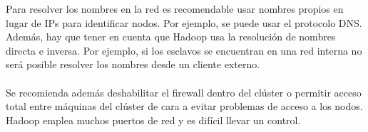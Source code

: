 Para resolver los nombres en la red es recomendable usar nombres propios en lugar de IPs para identificar nodos. Por ejemplo, se puede usar el protocolo DNS. Además, hay que tener en cuenta que Hadoop usa la resolución de nombres directa e inversa. Por ejemplo, si los esclavos se encuentran en una red interna no será posible resolver los nombres desde un cliente externo.\\\\
Se recomienda además deshabilitar el firewall dentro del clúster o permitir acceso total entre máquinas del clúster de cara a evitar problemas de acceso a los nodos. Hadoop emplea muchos puertos de red y es difícil llevar un control.
